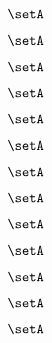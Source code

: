 \begin{forslides}
    \begin{equation}
        \label{eq:slides-processes-70}
        \setA
    \end{equation}

    \begin{equation}
        \label{eq:slides-processes-71}
        \setA
    \end{equation}

    \begin{equation}
        \label{eq:slides-processes-72}
        \setA
    \end{equation}

    \begin{equation}
        \label{eq:slides-processes-73}
        \setA
    \end{equation}

    \begin{equation}
        \label{eq:slides-processes-74}
        \setA
    \end{equation}

    \begin{equation}
        \label{eq:slides-processes-75}
        \setA
    \end{equation}

    \begin{equation}
        \label{eq:slides-processes-76}
        \setA
    \end{equation}

    \begin{equation}
        \label{eq:slides-processes-77}
        \setA
    \end{equation}

    \begin{equation}
        \label{eq:slides-processes-78}
        \setA
    \end{equation}

    \begin{equation}
        \label{eq:slides-processes-79}
        \setA
    \end{equation}
    
    \begin{equation}
        \label{eq:slides-processes-80}
        \setA
    \end{equation}

    \begin{equation}
        \label{eq:slides-processes-81}
        \setA
    \end{equation}

    \begin{equation}
        \label{eq:slides-processes-82}
        \setA
    \end{equation}


\end{forslides}
